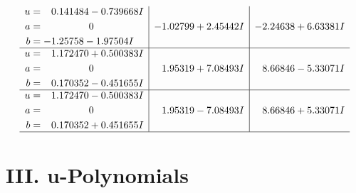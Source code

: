 \documentclass[1p]{elsarticle_modified}
\theoremstyle{definition}
\begin{document}
$$\begin{array}{c|c|c}
\begin{aligned}
u &= \phantom{-}0.141484 - 0.739668 I \\
a &= \phantom{-0.000000 } 0 \\
b &= -1.25758 - 1.97504 I\end{aligned}
 & -1.02799 + 2.45442 I & -2.24638 + 6.63381 I \\ \hline\begin{aligned}
u &= \phantom{-}1.172470 + 0.500383 I \\
a &= \phantom{-0.000000 } 0 \\
b &= \phantom{-}0.170352 - 0.451655 I\end{aligned}
 & \phantom{-}1.95319 + 7.08493 I & \phantom{-}8.66846 - 5.33071 I \\ \hline\begin{aligned}
u &= \phantom{-}1.172470 - 0.500383 I \\
a &= \phantom{-0.000000 } 0 \\
b &= \phantom{-}0.170352 + 0.451655 I\end{aligned}
 & \phantom{-}1.95319 - 7.08493 I & \phantom{-}8.66846 + 5.33071 I\\
 \hline 
 \end{array}$$\newpage
\newpage\renewcommand{\arraystretch}{1}
\centering \section*{ III. u-Polynomials}
\end{document}
